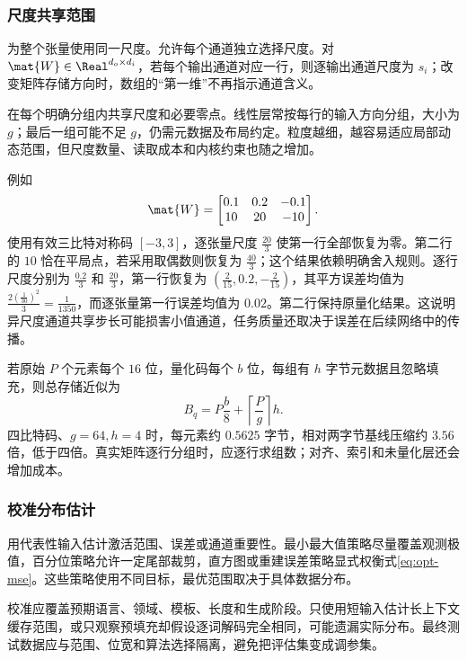 \documentclass[../textbook.tex]{subfiles}
\begin{document}
\subsubsection{尺度共享范围}
为整个张量使用同一尺度。允许每个通道独立选择尺度。对 $\mat{W}\in\Real^{d_o\times d_i}$，若每个输出通道对应一行，则逐输出通道尺度为 $s_i$；改变矩阵存储方向时，数组的“第一维”不再指示通道含义。

在每个明确分组内共享尺度和必要零点。线性层常按每行的输入方向分组，大小为 $g$；最后一组可能不足 $g$，仍需元数据及布局约定。粒度越细，越容易适应局部动态范围，但尺度数量、读取成本和内核约束也随之增加。

例如
\begin{equation}
\mat{W}=\begin{bmatrix}0.1&0.2&-0.1\\10&20&-10\end{bmatrix}.
\end{equation}
使用有效三比特对称码 $[-3,3]$，逐张量尺度 $\frac{20}{3}$ 使第一行全部恢复为零。第二行的 $10$ 恰在平局点，若采用取偶数则恢复为 $\frac{40}{3}$；这个结果依赖明确舍入规则。逐行尺度分别为 $\frac{0.2}{3}$ 和 $\frac{20}{3}$，第一行恢复为 $(\frac{2}{15},0.2,-\frac{2}{15})$，其平方误差均值为 $\frac{2(\frac{1}{30})^2}{3}=\frac{1}{1350}$，而逐张量第一行误差均值为 $0.02$。第二行保持原量化结果。这说明异尺度通道共享步长可能损害小值通道，任务质量还取决于误差在后续网络中的传播。

若原始 $P$ 个元素每个 $16$ 位，量化码每个 $b$ 位，每组有 $h$ 字节元数据且忽略填充，则总存储近似为
\begin{equation}
B_q=P\frac b8+\left\lceil\frac Pg\right\rceil h.
\end{equation}
四比特码、$g=64,h=4$ 时，每元素约 $0.5625$ 字节，相对两字节基线压缩约 $3.56$ 倍，低于四倍。真实矩阵逐行分组时，应逐行求组数；对齐、索引和未量化层还会增加成本。

\subsubsection{校准分布估计}
用代表性输入估计激活范围、误差或通道重要性。最小最大值策略尽量覆盖观测极值，百分位策略允许一定尾部裁剪，直方图或重建误差策略显式权衡式\eqref{eq:opt-mse}。这些策略使用不同目标，最优范围取决于具体数据分布。

校准应覆盖预期语言、领域、模板、长度和生成阶段。只使用短输入估计长上下文缓存范围，或只观察预填充却假设逐词解码完全相同，可能遗漏实际分布。最终测试数据应与范围、位宽和算法选择隔离，避免把评估集变成调参集。
\end{document}
